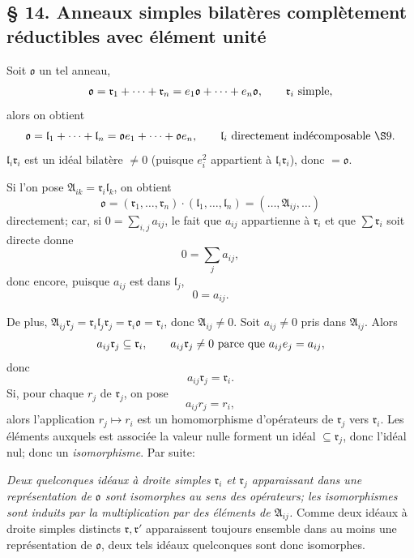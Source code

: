 
\providecommand{\mo}{\mathfrak{o}}
\providecommand{\ml}{\mathfrak{l}}
\providecommand{\mr}{\mathfrak{r}}
\providecommand{\mA}{\mathfrak{A}}
\providecommand{\mZ}{\mathfrak{Z}}
\providecommand{\srcfntext}[2]{%
  \begingroup
  \renewcommand{\thefootnote}{#1}%
  \footnotetext{#2}%
  \endgroup}

\subsection*{\S{} 14. Anneaux simples bilatères complètement réductibles avec élément unité}

Soit $\mo$ un tel anneau,
\[
        \mo=\mr_1+\cdots+\mr_n=e_1\mo+\cdots+e_n\mo,
        \qquad \mr_i\hbox{ simple},
\]
alors on obtient
\[
        \mo=\ml_1+\cdots+\ml_n=\mo e_1+\cdots+\mo e_n,
        \qquad \ml_i\hbox{ directement indécomposable }\hbox{\(\S 9\)}.
\]
$\ml_i\mr_i$ est un idéal bilatère $\ne0$ (puisque $e_i^2$ appartient à $\ml_i\mr_i$), donc $=\mo$.

Si l'on pose $\mA_{ik}=\mr_i\ml_k$, on obtient
\[
        \mo=(\mr_1,\ldots,\mr_n)\cdot(\ml_1,\ldots,\ml_n)
        = (\ldots,\mA_{ij},\ldots)
\]
directement; car, si $0=\sum_{i,j}a_{ij}$, le fait que $a_{ij}$ appartienne à $\mr_i$ et que $\sum\mr_i$ soit directe donne
\[
        0=\sum_j a_{ij},
\]
donc encore, puisque $a_{ij}$ est dans $\ml_j$,
\[
        0=a_{ij}.
\]

De plus, $\mA_{ij}\mr_j=\mr_i\ml_j\mr_j=\mr_i\mo=\mr_i$, donc $\mA_{ij}\ne0$. Soit $a_{ij}\ne0$ pris dans $\mA_{ij}$. Alors
\[
        a_{ij}\mr_j\subseteq\mr_i,
        \qquad
        a_{ij}\mr_j\ne0 \hbox{ parce que } a_{ij}e_j=a_{ij},
\]
donc
\[
        a_{ij}\mr_j=\mr_i.
\]
Si, pour chaque $r_j$ de $\mr_j$, on pose
\[
        a_{ij}r_j=r_i,
\]
alors l'application $r_j\mapsto r_i$ est un homomorphisme d'opérateurs de $\mr_j$ vers $\mr_i$. Les éléments auxquels est associée la valeur nulle forment un idéal $\subseteq\mr_j$, donc l'idéal nul; donc un \emph{isomorphisme}. Par suite:

\emph{Deux quelconques idéaux à droite simples $\mr_i$ et $\mr_j$ apparaissant dans une représentation de $\mo$ sont isomorphes au sens des opérateurs; les isomorphismes sont induits par la multiplication par des éléments de $\mA_{ij}$.} Comme deux idéaux à droite simples distincts $\mr,\mr'$ apparaissent toujours ensemble dans au moins une représentation de $\mo$, deux tels idéaux quelconques sont donc isomorphes.

